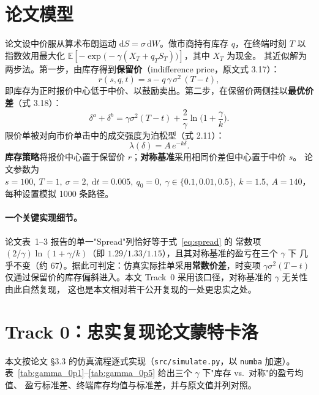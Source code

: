 \documentclass[11pt]{ctexart}
\begin{document}
\section{论文模型}
\label{sec:model}
论文设中价服从算术布朗运动 $\mathrm{d}S=\sigma\,\mathrm{d}W$。做市商持有库存 $q$，在终端时刻 $T$
以指数效用最大化 $\mathbb{E}\!\left[-\exp\!\big(-\gamma(X_T+q_T S_T)\big)\right]$，其中 $X_T$ 为现金。
其近似解为两步法。第一步，由库存得到\textbf{保留价}（indifference price，原文式 3.17）：
\begin{equation}
\label{eq:reservation}
r(s,q,t)=s-q\,\gamma\,\sigma^2\,(T-t),
\end{equation}
即库存为正时报价中心低于中价、以鼓励卖出。第二步，在保留价两侧挂以\textbf{最优价差}（式 3.18）：
\begin{equation}
\label{eq:spread}
\delta^a+\delta^b=\gamma\sigma^2(T-t)+\frac{2}{\gamma}\ln\!\Big(1+\frac{\gamma}{k}\Big).
\end{equation}
限价单被对向市价单击中的成交强度为泊松型（式 2.11）：
\begin{equation}
\label{eq:intensity}
\lambda(\delta)=A\,e^{-k\delta}.
\end{equation}
\textbf{库存策略}将报价中心置于保留价 $r$；\textbf{对称基准}采用相同价差但中心置于中价 $s$。
论文参数为 $s=100,\ T=1,\ \sigma=2,\ \mathrm{d}t=0.005,\ q_0=0,\
\gamma\in\{0.1,0.01,0.5\},\ k=1.5,\ A=140$，每种设置模拟 1000 条路径。

\paragraph{一个关键实现细节。}论文表~1--3 报告的单一"Spread"列恰好等于式~\eqref{eq:spread} 的
常数项 $(2/\gamma)\ln(1+\gamma/k)$（即 $1.29/1.33/1.15$），且其对称基准的盈亏在三个 $\gamma$ 下
几乎不变（约 $67$）。据此可判定：仿真实际挂单采用\textbf{常数价差}，时变项 $\gamma\sigma^2(T-t)$
仅通过保留价的库存偏斜进入。本文 Track~0 采用该口径，对称基准的 $\gamma$ 无关性由此自然复现，
这也是本文相对若干公开复现的一处更忠实之处。

\section{Track 0：忠实复现论文蒙特卡洛}
\label{sec:track0}
本文按论文 §3.3 的仿真流程逐式实现（\texttt{src/simulate.py}，以 \texttt{numba} 加速）。
表~\ref{tab:gamma_0p1}--\ref{tab:gamma_0p5} 给出三个 $\gamma$ 下"库存 vs.\ 对称"的盈亏均值、
盈亏标准差、终端库存均值与标准差，并与原文值并列对照。


\end{document}
